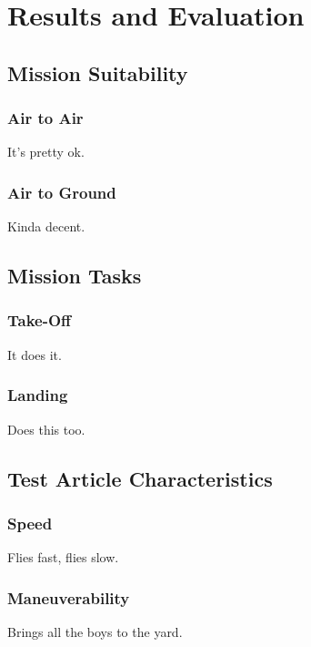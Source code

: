 \chapter{Results and Evaluation}\label{ch:RandE}

\section{Mission Suitability}\label{sec:MissionSuitability}
\subsection{Air to Air}\label{subsec:airtoair}
\p It's pretty ok. \pp \label{par:airtoair}

\subsection{Air to Ground}\label{subsec:airtoground}
\p Kinda decent. \pp \label{par:airtoground}

\section{Mission Tasks}\label{sec:MissionTasks}
\subsection{Take-Off}\label{subsec:takeoff}
\p It does it. \pp \label{par:takeoff}

\subsection{Landing}\label{subsec:landing}
\p Does this too. \pp \label{par:landing}

\section{Test Article Characteristics}\label{sec:TestArticle}
\subsection{Speed}\label{subsec:speed}
\p Flies fast, flies slow. \pp \label{par:speed}

\subsection{Maneuverability}\label{subsec:maneuverability}
\p Brings all the boys to the yard. \pp \label{par:manueverability}

\pagebreak